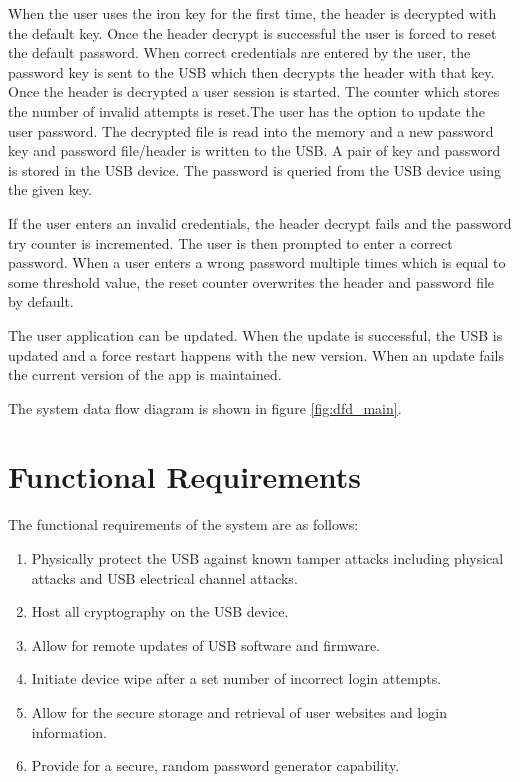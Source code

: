 When the user uses the iron key for the first time, the header is decrypted with
the default key. Once the header decrypt is successful the user is forced to
reset the default password. When correct credentials are entered by the user,
the password key is sent to the USB which then decrypts the header with that
key.  Once the header is decrypted a user session is started. The counter
which stores the number of invalid attempts is reset.The user has the option to
update the user password. The decrypted file is read into the memory and a new
password key and password file/header is written to the USB. A pair of key and
password is stored in the USB device. The password is queried from the USB
device using the given key.

If the user enters an invalid credentials, the header decrypt fails and the
password try counter is incremented. The user is
then prompted to enter a correct password. When a user enters a wrong password
multiple times which is equal to some threshold value, the reset counter
overwrites the header and password file by default.

The user application can be updated. When the update is successful, the USB is
updated and a force restart happens with the new version. When an update fails
the current version of the app is maintained.

The system data flow diagram is shown in figure \ref{fig:dfd_main}.


\section{Functional Requirements}
\label{sec:funcreq}
The functional requirements of the system are as follows:
\begin{enumerate}
    \item{Physically protect the USB against known tamper attacks including
physical attacks and USB electrical channel attacks.}
    \item{Host all cryptography on the USB device.}
    \item{Allow for remote updates of USB software and firmware.}
    \item{Initiate device wipe after a set number of incorrect login attempts.}
    \item{Allow for the secure storage and retrieval of user websites and login
information.}
    \item{Provide for a secure, random password generator capability.}
\end{enumerate}
